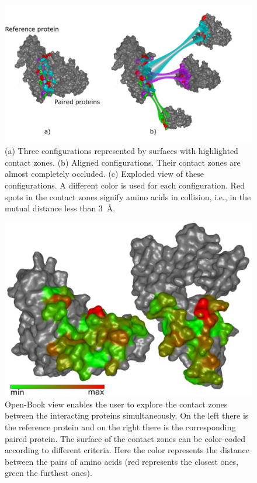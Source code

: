 \documentclass{bmcart}
\def\OpBook {Open-Book view\xspace}
\def\ExpView {Exploded view\xspace}
\begin{document}
\begin{backmatter}
\begin{figure}[h!]
    \centering
    \includegraphics[width=0.9\columnwidth]{images/figure5.pdf}
    \caption{
    (a) Three configurations represented by surfaces with highlighted contact zones. (b) Aligned configurations. Their contact zones are almost completely occluded. (c) \ExpView of these configurations. A different color is used for each configuration. Red spots in the contact zones signify amino acids in collision, i.e., in the mutual distance less than 3~\AA.}
	\label{fig:case12}
\end{figure}

\begin{figure}[h!]
  \centering
  \includegraphics[width=0.9\columnwidth]{images/figure6.pdf}
  \caption{\csentence{\OpBook.} \OpBook enables the user to explore the contact zones between the interacting proteins simultaneously. On the left there is the reference protein and on the right there is the corresponding paired protein. The surface of the contact zones can be color-coded according to different criteria. Here the color represents the distance between the pairs of amino acids (red represents the closest ones, green the furthest ones).}
  \label{fig:book}
\end{figure}


\end{backmatter}
\end{document}
